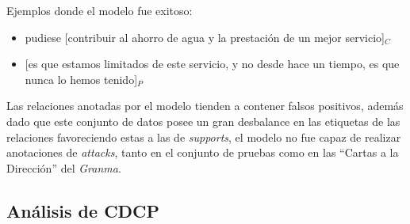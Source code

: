 \documentclass[a4paper,11pt,twocolumn,twoside]{article}
\begin{document}
Ejemplos donde el modelo fue exitoso:
\begin{itemize}
	\item pudiese [contribuir al ahorro de agua y la prestación de un mejor servicio]$_C$ %
	\item \text{} [es que estamos limitados de este servicio, y no desde hace un tiempo, es que nunca lo hemos tenido]$_P$ %
\end{itemize}

Las relaciones anotadas por el modelo tienden a contener falsos positivos, además
dado que este conjunto de datos posee un gran desbalance en las etiquetas de las relaciones favoreciendo 
estas a las de \textit{supports}, el modelo no fue capaz de realizar anotaciones de \textit{attacks}, tanto en 
el conjunto de pruebas como en las ``Cartas a la Dirección'' del \textit{Granma}.

\subsection{Análisis de CDCP}

\end{document}
